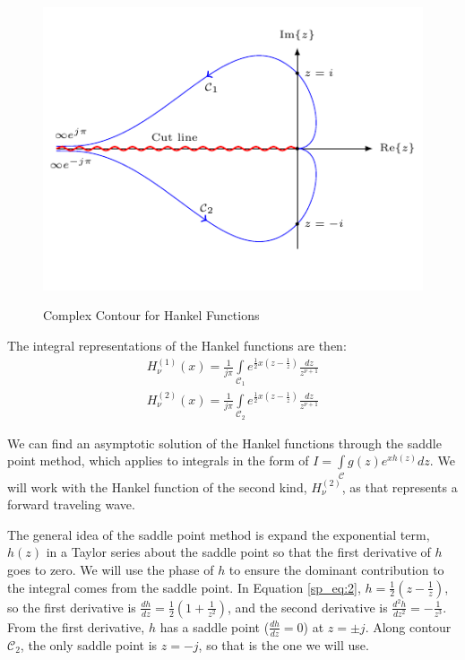 \begin{figure}[ht]
  \begin{center}
\includegraphics[width=5in]{../media/hankel_contours-figure1.pdf}
\end{center}
  \renewcommand{\baselinestretch}{1}\small\normalsize
  \begin{quote}
    \caption[Complex Contour for Hankel Functions]{Complex Contour for Hankel Functions\label{sp_fig:2}}
  \end{quote}
\end{figure}
\renewcommand{\baselinestretch}{2} \small\normalsize

The integral representations of the Hankel functions are then:
\begin{equation}
  \begin{gathered}
    H_{\nu}^{(1)}(x) = \frac{1}{j\pi}\int\limits_{\mathcal{C}_1}e^{\frac{1}{2}x\left(z- \frac{1}{z} \right)} \frac{dz}{z^{\nu+1}} \\
    H_{\nu}^{(2)}(x) = \frac{1}{j\pi}\int\limits_{\mathcal{C}_2}e^{\frac{1}{2}x\left(z- \frac{1}{z} \right)} \frac{dz}{z^{\nu+1}} 
    \end{gathered}
  \label{sp_eq:2}
  \end{equation}
\renewcommand{\baselinestretch}{2} \small\normalsize

We can find an asymptotic solution of the Hankel functions through the saddle point method, which applies to integrals in the form of $I = \int\limits_{\mathcal{C}}g(z)e^{xh(z)}dz$. We will work with the Hankel function of the second kind, $H_{\nu}^{(2)}$, as that represents a forward traveling wave.

The general idea of the saddle point method is expand the exponential term, $h(z)$ in a Taylor series about the saddle point so that the first derivative of $h$ goes to zero. We will use the phase of $h$ to ensure the dominant contribution to the integral comes from the saddle point. In Equation \ref{sp_eq:2}, $h = \frac{1}{2}\left(z-\frac{1}{z}\right)$, so the first derivative is $\frac{dh}{dz} = \frac{1}{2}\left(1+\frac{1}{z^2}\right)$, and the second derivative is $\frac{d^2h}{dz^2} = -\frac{1}{z^3}$. From the first derivative, $h$ has a saddle point ($\frac{dh}{dz}=0$) at $z=\pm j$. Along contour $\mathcal{C}_2$, the only saddle point is $z=-j$, so that is the one we will use.


